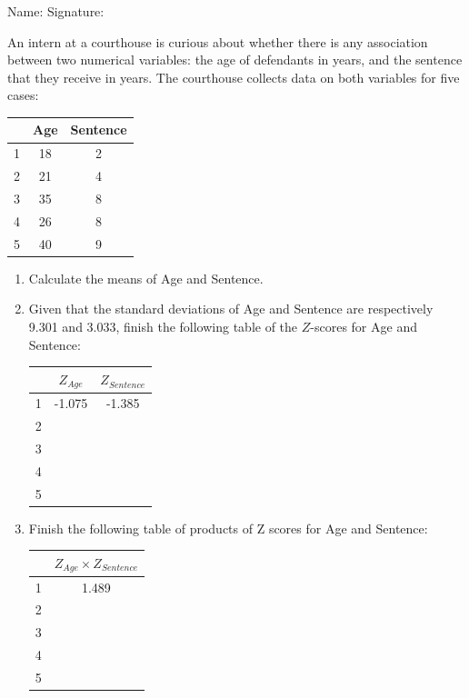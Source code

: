 \documentclass[11pt, chapterprefix=true]{scrbook}\usepackage[]{graphicx}\usepackage[]{color}
\begin{document}
\begin{exercises}
\begin{exercise}
\begin{center}
{{\vspace{4mm}
Name: \underline{\phantom{xxxxxxxxxxxxxxxxxxxxxxxx}} Signature: \underline{\phantom{xxxxxxxxxxxxxxxxxxxxxxxx}}
 }}
\end{center}

An intern at a courthouse is curious about whether there is any association between two numerical variables: the age of defendants in years, and the sentence that they receive in years. The courthouse collects data on both variables for five cases:

\begin{center}
\begin{tabular}{@{} ccc @{}} \hline
  &	Age &	Sentence \\ \hline
1&	18&	2 \\
2&	21&	4 \\
3&	35&	8 \\
4&	26&	8 \\
5&	40&	9 \\ \hline
\end{tabular}
\end{center}

\begin{enumerate}
  \item Calculate the means of Age and Sentence.
  \item	Given that the standard deviations of Age and Sentence are respectively 9.301 and 3.033, finish the following table of the $Z$-scores for Age and Sentence:

{\small{
\begin{center}
\begin{tabular}{@{} ccc @{}} \hline
 &	$Z_{Age}$ &	$Z_{Sentence}$ \\ \hline
1&	-1.075&	-1.385 \\
2& & \\		
3& & \\		
4& & \\		
5& & \\ \hline
\end{tabular}
\end{center}  }}

  \item	Finish the following table of products of Z scores for Age and Sentence:

{\small{
\begin{center}
\begin{tabular}{@{} cc @{}} \hline
 &	$Z_{Age} \times Z_{Sentence}$ \\ \hline
1	& 1.489 \\
2	& \\
3	& \\
4	& \\
5	& \\ \hline
\end{tabular}
\end{center} }}


\end{enumerate}
\end{exercise}
\end{exercises}
\end{document}
